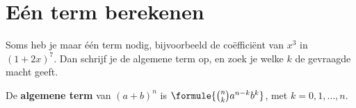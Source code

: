 \section{Eén term berekenen}

Soms heb je maar één term nodig, bijvoorbeeld de coëfficiënt van $x^3$ in $(1 + 2x)^7$. Dan schrijf je de algemene term op, en zoek je welke $k$ de gevraagde macht geeft.

\begin{theorie}
De \textbf{\textcolor{accent}{algemene term}} van $(a + b)^n$ is \quad $\formule{\binom{n}{k} a^{n - k} b^k}$, \quad met $k = 0, 1, \ldots, n$.
\end{theorie}


\begin{oefeningen}
\end{oefeningen}

